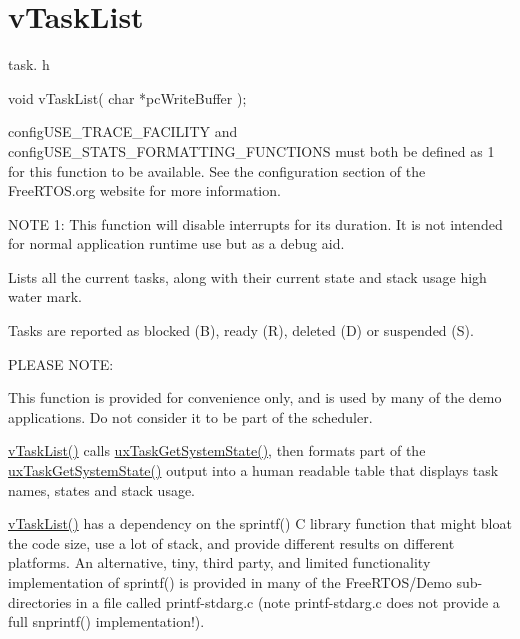 \hypertarget{group__v_task_list}{}\section{v\+Task\+List}
\label{group__v_task_list}
task. h 
\begin{DoxyPre}void vTaskList( char *pcWriteBuffer );\end{DoxyPre}


config\+U\+S\+E\+\_\+\+T\+R\+A\+C\+E\+\_\+\+F\+A\+C\+I\+L\+I\+TY and config\+U\+S\+E\+\_\+\+S\+T\+A\+T\+S\+\_\+\+F\+O\+R\+M\+A\+T\+T\+I\+N\+G\+\_\+\+F\+U\+N\+C\+T\+I\+O\+NS must both be defined as 1 for this function to be available. See the configuration section of the Free\+R\+T\+O\+S.\+org website for more information.

N\+O\+TE 1\+: This function will disable interrupts for its duration. It is not intended for normal application runtime use but as a debug aid.

Lists all the current tasks, along with their current state and stack usage high water mark.

Tasks are reported as blocked (\textquotesingle{}B\textquotesingle{}), ready (\textquotesingle{}R\textquotesingle{}), deleted (\textquotesingle{}D\textquotesingle{}) or suspended (\textquotesingle{}S\textquotesingle{}).

P\+L\+E\+A\+SE N\+O\+TE\+:

This function is provided for convenience only, and is used by many of the demo applications. Do not consider it to be part of the scheduler.

\mbox{\hyperlink{task_8h_a094a608b1b19b9d3cb41254661653ec2}{v\+Task\+List()}} calls \mbox{\hyperlink{task_8h_ade68760111c37287a3b82c41dff8ec7d}{ux\+Task\+Get\+System\+State()}}, then formats part of the \mbox{\hyperlink{task_8h_ade68760111c37287a3b82c41dff8ec7d}{ux\+Task\+Get\+System\+State()}} output into a human readable table that displays task names, states and stack usage.

\mbox{\hyperlink{task_8h_a094a608b1b19b9d3cb41254661653ec2}{v\+Task\+List()}} has a dependency on the sprintf() C library function that might bloat the code size, use a lot of stack, and provide different results on different platforms. An alternative, tiny, third party, and limited functionality implementation of sprintf() is provided in many of the Free\+R\+T\+O\+S/\+Demo sub-\/directories in a file called printf-\/stdarg.\+c (note printf-\/stdarg.\+c does not provide a full snprintf() implementation!).

